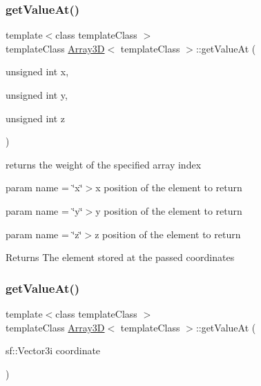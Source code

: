 \subsubsection{\texorpdfstring{get\+Value\+At()}{getValueAt()}\hspace{0.1cm}{\footnotesize\ttfamily [1/2]}}
{\footnotesize\ttfamily template$<$class template\+Class $>$ \\
template\+Class \hyperlink{class_array3_d}{Array3D}$<$ template\+Class $>$\+::get\+Value\+At (\begin{DoxyParamCaption}\item[{unsigned int}]{x,  }\item[{unsigned int}]{y,  }\item[{unsigned int}]{z }\end{DoxyParamCaption})\hspace{0.3cm}{\ttfamily [inline]}}



returns the weight of the specified array index 

param name = \char`\"{}x\char`\"{}$>$x position of the element to return

param name = \char`\"{}y\char`\"{}$>$y position of the element to return

param name = \char`\"{}z\char`\"{}$>$z position of the element to return

\begin{DoxyReturn}{Returns}
The element stored at the passed coordinates
\end{DoxyReturn}
\mbox{\label{class_array3_d_ac1539b1f9907ae9996178b968e43c53c}} 
\subsubsection{\texorpdfstring{get\+Value\+At()}{getValueAt()}\hspace{0.1cm}{\footnotesize\ttfamily [2/2]}}
{\footnotesize\ttfamily template$<$class template\+Class $>$ \\
template\+Class \hyperlink{class_array3_d}{Array3D}$<$ template\+Class $>$\+::get\+Value\+At (\begin{DoxyParamCaption}\item[{sf\+::\+Vector3i}]{coordinate }\end{DoxyParamCaption})\hspace{0.3cm}{\ttfamily [inline]}}




